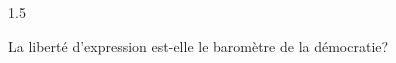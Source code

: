 \documentclass[12pt]{article}
\begin{document}
\begin{spacing}{1.5}

La liberté d'expression est-elle le baromètre de la démocratie?


\quad
\quad

\end{spacing}
\end{document}
